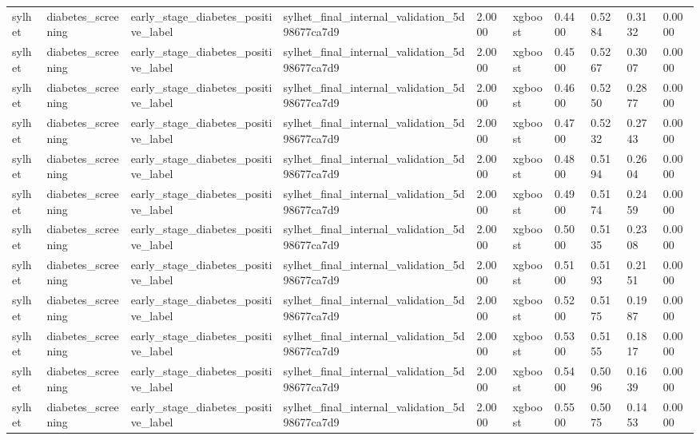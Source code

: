 \begin{tabular}{llllllllll}
sylhet & diabetes\_screening & early\_stage\_diabetes\_positive\_label & sylhet\_final\_internal\_validation\_5d98677ca7d9 & 2.0000 & xgboost & 0.4400 & 0.5284 & 0.3132 & 0.0000 \\
sylhet & diabetes\_screening & early\_stage\_diabetes\_positive\_label & sylhet\_final\_internal\_validation\_5d98677ca7d9 & 2.0000 & xgboost & 0.4500 & 0.5267 & 0.3007 & 0.0000 \\
sylhet & diabetes\_screening & early\_stage\_diabetes\_positive\_label & sylhet\_final\_internal\_validation\_5d98677ca7d9 & 2.0000 & xgboost & 0.4600 & 0.5250 & 0.2877 & 0.0000 \\
sylhet & diabetes\_screening & early\_stage\_diabetes\_positive\_label & sylhet\_final\_internal\_validation\_5d98677ca7d9 & 2.0000 & xgboost & 0.4700 & 0.5232 & 0.2743 & 0.0000 \\
sylhet & diabetes\_screening & early\_stage\_diabetes\_positive\_label & sylhet\_final\_internal\_validation\_5d98677ca7d9 & 2.0000 & xgboost & 0.4800 & 0.5194 & 0.2604 & 0.0000 \\
sylhet & diabetes\_screening & early\_stage\_diabetes\_positive\_label & sylhet\_final\_internal\_validation\_5d98677ca7d9 & 2.0000 & xgboost & 0.4900 & 0.5174 & 0.2459 & 0.0000 \\
sylhet & diabetes\_screening & early\_stage\_diabetes\_positive\_label & sylhet\_final\_internal\_validation\_5d98677ca7d9 & 2.0000 & xgboost & 0.5000 & 0.5135 & 0.2308 & 0.0000 \\
sylhet & diabetes\_screening & early\_stage\_diabetes\_positive\_label & sylhet\_final\_internal\_validation\_5d98677ca7d9 & 2.0000 & xgboost & 0.5100 & 0.5193 & 0.2151 & 0.0000 \\
sylhet & diabetes\_screening & early\_stage\_diabetes\_positive\_label & sylhet\_final\_internal\_validation\_5d98677ca7d9 & 2.0000 & xgboost & 0.5200 & 0.5175 & 0.1987 & 0.0000 \\
sylhet & diabetes\_screening & early\_stage\_diabetes\_positive\_label & sylhet\_final\_internal\_validation\_5d98677ca7d9 & 2.0000 & xgboost & 0.5300 & 0.5155 & 0.1817 & 0.0000 \\
sylhet & diabetes\_screening & early\_stage\_diabetes\_positive\_label & sylhet\_final\_internal\_validation\_5d98677ca7d9 & 2.0000 & xgboost & 0.5400 & 0.5096 & 0.1639 & 0.0000 \\
sylhet & diabetes\_screening & early\_stage\_diabetes\_positive\_label & sylhet\_final\_internal\_validation\_5d98677ca7d9 & 2.0000 & xgboost & 0.5500 & 0.5075 & 0.1453 & 0.0000 \\

\end{tabular}

